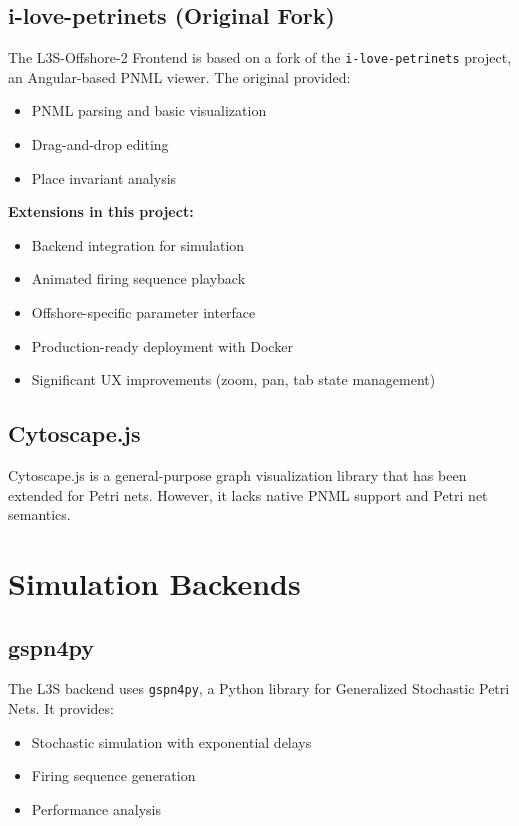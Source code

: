 \subsection{i-love-petrinets (Original Fork)}

The L3S-Offshore-2 Frontend is based on a fork of the \texttt{i-love-petrinets} project, an Angular-based PNML viewer. The original provided:

\begin{itemize}
    \item PNML parsing and basic visualization
    \item Drag-and-drop editing
    \item Place invariant analysis
\end{itemize}

\textbf{Extensions in this project:}
\begin{itemize}
    \item Backend integration for simulation
    \item Animated firing sequence playback
    \item Offshore-specific parameter interface
    \item Production-ready deployment with Docker
    \item Significant UX improvements (zoom, pan, tab state management)
\end{itemize}

\subsection{Cytoscape.js}

Cytoscape.js is a general-purpose graph visualization library that has been extended for Petri nets. However, it lacks native PNML support and Petri net semantics.

\section{Simulation Backends}
\label{sec:simulation-backends}

\subsection{gspn4py}

The L3S backend uses \texttt{gspn4py}, a Python library for Generalized Stochastic Petri Nets. It provides:

\begin{itemize}
    \item Stochastic simulation with exponential delays
    \item Firing sequence generation
    \item Performance analysis
\end{itemize}

